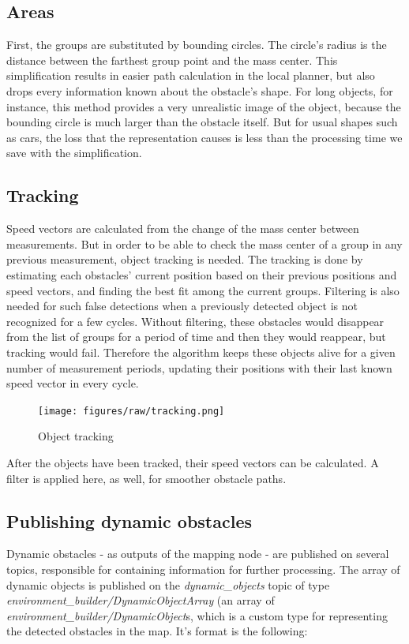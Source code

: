 \subsection{Areas}
First, the groups are substituted by bounding circles. The circle's radius is the distance between the farthest group point and the mass center. This simplification results in easier path calculation in the local planner, but also drops every information known about the obstacle's shape. For long objects, for instance, this method provides a very unrealistic image of the object, because the bounding circle is much larger than the obstacle itself. But for usual shapes such as cars, the loss that the representation causes is less than the processing time we save with the simplification.

\subsection{Tracking}
\label{chap:tracking}
Speed vectors are calculated from the change of the mass center between measurements. But in order to be able to check the mass center of a group in any previous measurement, object tracking is needed. The tracking is done by estimating each obstacles' current position based on their previous positions and speed vectors, and finding the best fit among the current groups. Filtering is also needed for such false detections when a previously detected object is not recognized for a few cycles. Without filtering, these obstacles would disappear from the list of groups for a period of time and then they would reappear, but tracking would fail. Therefore the algorithm keeps these objects alive for a given number of measurement periods, updating their positions with their last known speed vector in every cycle.

\begin{figure}[!ht]
    \centering
    \texttt{[image: figures/raw/tracking.png]}
    \caption{Object tracking}
    \label{tracking}
\end{figure}

After the objects have been tracked, their speed vectors can be calculated. A filter is applied here, as well, for smoother obstacle paths.

\subsection{Publishing dynamic obstacles}
\label{chap:publishing_dynamic_obstacles}
Dynamic obstacles - as outputs of the mapping node - are published on several topics, responsible for containing information for further processing. The array of dynamic objects is published on the \textit{dynamic\_objects} topic of type \textit{environment\_builder/DynamicObjectArray} (an array of \textit{environment\_builder/DynamicObject}s, which is a custom type for representing the detected obstacles in the map. It's format is the following:

